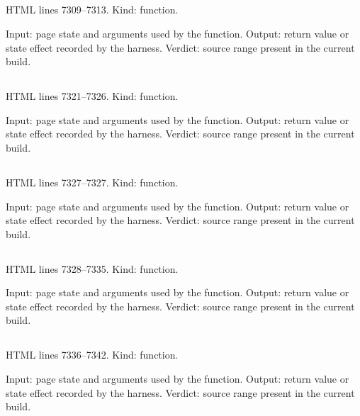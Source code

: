 \subsection*{\texttt{}}
\label{vf_362_mgItemSentence}
HTML lines 7309--7313. Kind: function.

Input: page state and arguments used by the function.
Output: return value or state effect recorded by the harness.
Verdict: source range present in the current build.

\subsection*{\texttt{}}
\label{vf_363_mgStage}
HTML lines 7321--7326. Kind: function.

Input: page state and arguments used by the function.
Output: return value or state effect recorded by the harness.
Verdict: source range present in the current build.

\subsection*{\texttt{}}
\label{vf_364_mgStageSet}
HTML lines 7327--7327. Kind: function.

Input: page state and arguments used by the function.
Output: return value or state effect recorded by the harness.
Verdict: source range present in the current build.

\subsection*{\texttt{}}
\label{vf_365_mgApplyChartView}
HTML lines 7328--7335. Kind: function.

Input: page state and arguments used by the function.
Output: return value or state effect recorded by the harness.
Verdict: source range present in the current build.

\subsection*{\texttt{}}
\label{vf_366_mgZoom}
HTML lines 7336--7342. Kind: function.

Input: page state and arguments used by the function.
Output: return value or state effect recorded by the harness.
Verdict: source range present in the current build.


